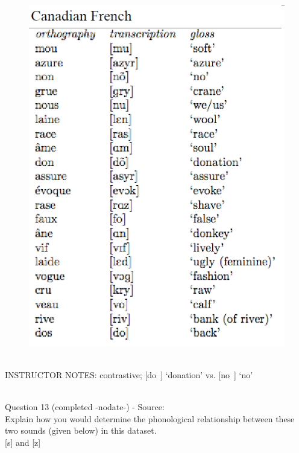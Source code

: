 \documentclass[12pt]{article}
\begin{document}
\begin{figure}[H]
\includegraphics{../images/canadianfrench.png}
\end{figure}

~\\
INSTRUCTOR NOTES: contrastive; [do~] ‘donation’ vs. [no~] ‘no’


~\\

{\large Question 13} (completed -nodate-) - Source: \\

Explain how you would determine the phonological relationship between these two sounds (given below) in this dataset.\\

{[s]} and {[z]}
\end{document}
